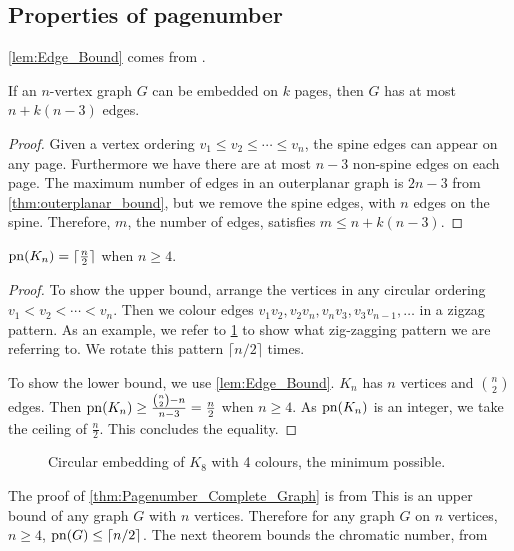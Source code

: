 \subsection{Properties of pagenumber}\label{ssec:Related_Properties}
\cref{lem:Edge_Bound} comes from \textcite{bernhartBookThicknessGraph1979}.
\begin{lemma}\label{lem:Edge_Bound}
	If an \(n\)-vertex graph \(G\) can be embedded on $k$ pages, then \(G\) has at most \(n + k(n-3)\) edges.
\end{lemma}
\begin{proof}
	Given a vertex ordering \(v_1 \leq v_2 \leq \cdots \leq v_n\), the spine edges can appear on any page. Furthermore we have there are at most \(n-3\) non-spine edges on each page. The maximum number of edges in an outerplanar graph is \(2n - 3\) from \cref{thm:outerplanar_bound}, but we remove the spine edges, with \(n\) edges on the spine. Therefore, \(m\), the number of edges, satisfies \(m \leq n + k (n - 3)\).
\end{proof}
\begin{theorem}[]\label{thm:Pagenumber_Complete_Graph}
	$\operatorname{pn}(K_n) = \lceil \frac{n}{2} \rceil$ when $n \geq 4$.
\end{theorem}
\begin{proof}
	To show the upper bound, arrange the vertices in any circular ordering $v_1 < v_2 < \cdots < v_n$. Then we colour edges $v_1 v_2, v_2 v_{n}, v_{n} v_{3}, v_{3} v_{n-1}, \ldots$ in a zigzag pattern. As an example, we refer to \cref{fig:k8 coloured with colours} to show what zig-zagging pattern we are referring to. We rotate this pattern $\lceil n/2 \rceil$ times. 
	\par
	To show the lower bound, we use \cref{lem:Edge_Bound}. \(K_n\) has \(n\) vertices and \(\binom{n}{2}\) edges. Then \(\operatorname{pn}(K_n) \geq \frac{\binom{n}{2} - n}{n - 3} = \frac{n}{2}\) when \(n \geq 4\). As \(\operatorname{pn}(K_n)\) is an integer, we take the ceiling of \(\frac{n}{2}\). This concludes the equality.
\end{proof}
\begin{figure}[ht]
	\caption{Circular embedding of \(K_8\) with 4 colours, the minimum possible.}
	\centering
	\label{fig:k8 coloured with colours}
\end{figure}
The proof of \cref{thm:Pagenumber_Complete_Graph} is from \textcite{bernhartBookThicknessGraph1979}
This is an upper bound of any graph \(G\) with \(n\) vertices.
Therefore for any graph \(G\) on \(n\) vertices, \(n \geq 4\), \(\operatorname{pn}(G) \leq \lceil n/2 \rceil\). The next theorem bounds the chromatic number, from \textcite{bernhartBookThicknessGraph1979}
